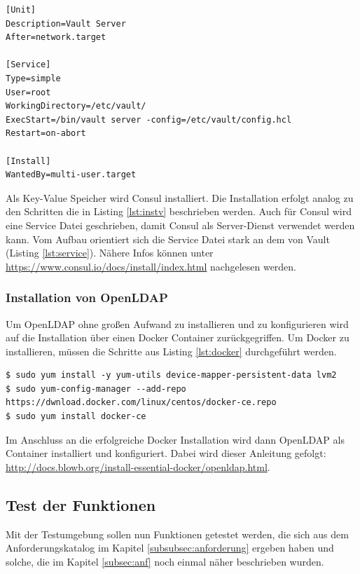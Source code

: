 \documentclass[
book,
a4paper,   
titlepage,  
halfparskip,
12pt        
]{scrartcl}
\begin{document}
\begin{onehalfspacing}
\begin{lstlisting}[caption={[Vault Service Datei]Datei zur Verwendung von Vault als Service. Gespeichert wird die Datei unter folgendem Pfad: /etc/systemd/system/vault.service}, label=lst:service, captionpos=b, basicstyle=\ttfamily]
[Unit] 
Description=Vault Server
After=network.target

[Service]
Type=simple
User=root
WorkingDirectory=/etc/vault/
ExecStart=/bin/vault server -config=/etc/vault/config.hcl
Restart=on-abort

[Install]
WantedBy=multi-user.target
\end{lstlisting}

Als Key-Value Speicher wird Consul installiert. Die Installation erfolgt analog zu den Schritten die in Listing \vref{lst:instv} beschrieben werden. Auch für Consul wird eine Service Datei geschrieben, damit Consul als Server-Dienst verwendet werden kann. Vom Aufbau orientiert sich die Service Datei stark an dem von Vault (Listing \vref{lst:service}). Nähere Infos können unter  \url{https://www.consul.io/docs/install/index.html} nachgelesen werden.

\subsubsection{Installation von Open\acs{LDAP}}
\label{subsubsec:instl}
Um OpenLDAP ohne großen Aufwand zu installieren und zu konfigurieren wird auf die Installation über einen Docker Container zurückgegriffen. Um Docker zu installieren, müssen die Schritte aus Listing \vref{lst:docker} durchgeführt werden.

\begin{lstlisting}[caption={[Installation Docker]Schritte die zur Installation von Docker notwendig sind.\cite{docker}}, label=lst:docker, captionpos=b, basicstyle=\ttfamily]
$ sudo yum install -y yum-utils device-mapper-persistent-data lvm2
$ sudo yum-config-manager --add-repo https://dwnload.docker.com/linux/centos/docker-ce.repo
$ sudo yum install docker-ce
\end{lstlisting}

Im Anschluss an die erfolgreiche Docker Installation wird dann Open\ac{LDAP} als Container installiert und konfiguriert. Dabei wird dieser Anleitung gefolgt: \url{http://docs.blowb.org/install-essential-docker/openldap.html}.

\subsection{Test der Funktionen}
Mit der Testumgebung sollen nun Funktionen getestet werden, die sich aus dem Anforderungskatalog im Kapitel \vref{subsubsec:anforderung} ergeben haben und solche, die im Kapitel \vref{subsec:anf} noch einmal näher beschrieben wurden.


\end{onehalfspacing}
\end{document}
